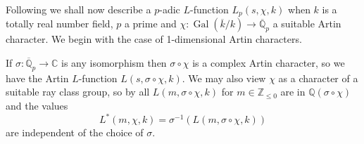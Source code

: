 \documentclass{amsart}
\begin{document}
Following \cite[pp.~80--81]{greenberg83} we shall now describe a {$p$-adic{\futurelet{}}} {$L$-function{\futurelet{}}} $ {L_{p}(s,{\chi},k)}$ when
$ k $ is a totally real number field, $ p $ a prime and 
$ \chi : {\operatorname{Gal}}({\overline{k}}/k) \to {{\overline {\mathbb Q}_p}} $ a suitable Artin character.
We begin with the case of 1-dimensional Artin characters.

If $\sigma:{{\overline {\mathbb Q}_p}} \to {\mathbb C}$ is any isomorphism then
$\sigma \circ \chi$ is a complex Artin character, so we have the Artin {$L$-function{\futurelet{}}} $  {L(s,{\sigma\circ\chi},k)}$.
We may also view $ \chi $ as a character of a suitable ray class group, so
by \cite[Corollary~9.9 and page~509]{Neu99} all $ {L(m,{\sigma\circ\chi},k)}$ for $m \in {\mathbb Z}_{\leq 0}$ 
are in $ {\mathbb Q}({\sigma}\circ\chi) $ and the values
\begin{equation}\label{sigmaindependence}
  {L^\ast(m,{\chi},k)}= \sigma^{-1}({L(m,{\sigma\circ\chi},k)})
\end{equation}
are independent of the choice of $\sigma$.
\end{document}
